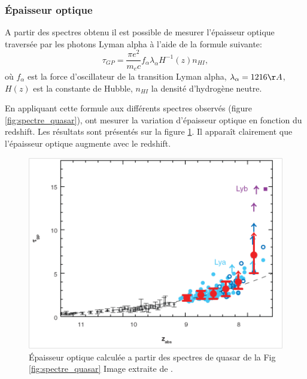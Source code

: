 \subsubsection{Épaisseur optique}

A partir des spectres obtenu il est possible de mesurer l’épaisseur optique traversée par les photons Lyman alpha à l'aide de la formule suivante:
\begin{equation}
\tau_{GP} = \frac{\pi e^2}{m_e c} f_\alpha \lambda_\alpha H^{-1}(z) n_{HI},
\end{equation}
où $f_\alpha$ est la force d'oscillateur de la transition Lyman alpha, $\lambda_\alpha = 1216 \AA$, $H(z)$ est la constante de Hubble, $n_{HI}$ la densité d'hydrogène neutre.

En appliquant cette formule aux différents spectres observés (figure \ref{fig:spectre_quasar}), \cite{fan_constraining_2006} ont mesurer la variation d'épaisseur optique en fonction du redshift.
Les résultats sont présentés sur la figure \ref{fig:epaisseur_optique_quasar}.
Il apparaît clairement que l'épaisseur optique augmente avec le redshift.

\begin{figure}
        \includegraphics[width=.95\linewidth]{img/01/epaisseur_optique_quasar.png} 
        \caption[Epaisseur optique Lyman alpha]{%
		Épaisseur optique calculée a partir des spectres de quasar de la Fig\,\ref{fig:spectre_quasar}
        Image extraite de \cite{fan_constraining_2006}.}
 		\label{fig:epaisseur_optique_quasar}
\end{figure}

